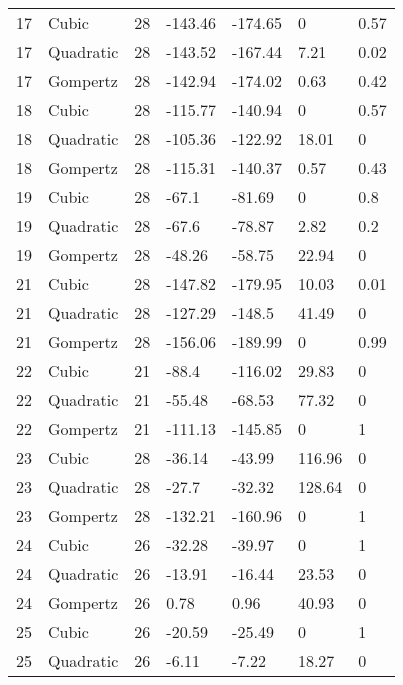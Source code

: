 \documentclass[11pt]{article}
\begin{document}
\begin{center}
\begin{longtable}{lllllll}
    17  & Cubic     & 28              & -143.46 & -174.65 & 0       & 0.57 \\
    17  & Quadratic & 28              & -143.52 & -167.44 & 7.21    & 0.02 \\
    17  & Gompertz  & 28              & -142.94 & -174.02 & 0.63    & 0.42 \\
    18  & Cubic     & 28              & -115.77 & -140.94 & 0       & 0.57 \\
    18  & Quadratic & 28              & -105.36 & -122.92 & 18.01   & 0    \\
    18  & Gompertz  & 28              & -115.31 & -140.37 & 0.57    & 0.43 \\
    19  & Cubic     & 28              & -67.1   & -81.69  & 0       & 0.8  \\
    19  & Quadratic & 28              & -67.6   & -78.87  & 2.82    & 0.2  \\
    19  & Gompertz  & 28              & -48.26  & -58.75  & 22.94   & 0    \\
    21  & Cubic     & 28              & -147.82 & -179.95 & 10.03   & 0.01 \\
    21  & Quadratic & 28              & -127.29 & -148.5  & 41.49   & 0    \\
    21  & Gompertz  & 28              & -156.06 & -189.99 & 0       & 0.99 \\
    22  & Cubic     & 21              & -88.4   & -116.02 & 29.83   & 0    \\
    22  & Quadratic & 21              & -55.48  & -68.53  & 77.32   & 0    \\
    22  & Gompertz  & 21              & -111.13 & -145.85 & 0       & 1    \\
    23  & Cubic     & 28              & -36.14  & -43.99  & 116.96  & 0    \\
    23  & Quadratic & 28              & -27.7   & -32.32  & 128.64  & 0    \\
    23  & Gompertz  & 28              & -132.21 & -160.96 & 0       & 1    \\
    24  & Cubic     & 26              & -32.28  & -39.97  & 0       & 1    \\
    24  & Quadratic & 26              & -13.91  & -16.44  & 23.53   & 0    \\
    24  & Gompertz  & 26              & 0.78    & 0.96    & 40.93   & 0    \\
    25  & Cubic     & 26              & -20.59  & -25.49  & 0       & 1    \\
    25  & Quadratic & 26              & -6.11   & -7.22   & 18.27   & 0    \\

\end{longtable}
\end{center}
\end{document}
